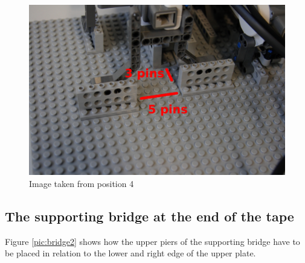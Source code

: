\documentclass[%
  a4paper,%
  11pt,%
  blue,%
  hyperref	%
  ]{tubsartcl}
\begin{document}
\begin{figure}[!htb]
\begin{center}
\includegraphics[scale=0.3]{graphics_lego/position4.jpg}
\end{center}
\caption{Image taken from position 4}
\label{pic:position4}
\end{figure}

\newpage

\subsection{The supporting bridge at the end of the tape}

Figure \ref{pic:bridge2} shows how the upper piers of the supporting bridge have to be placed in relation to the lower and right edge of the upper plate.
\end{document}
